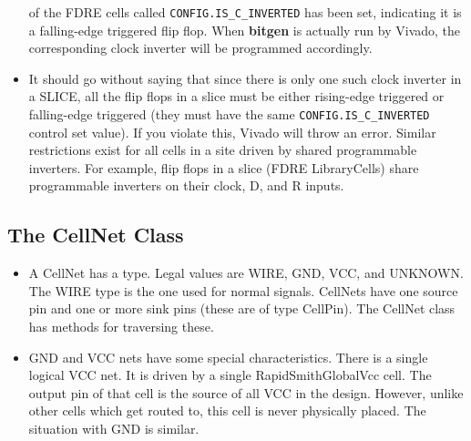\documentclass[12pt]{article}
\newcommand{\env}[1]{{\texttt{#1}}}
\newcommand{\pgm}[1]{{\textbf{#1}}}
\begin{document}
\begin{itemize}
  of the FDRE cells called \env{CONFIG.IS\_C\_INVERTED} has been set, indicating
  it is a falling-edge triggered flip flop.  When \pgm{bitgen} is actually run
  by Vivado, the corresponding clock inverter will be programmed accordingly.
  \item It should go without saying that since there is only one such clock
  inverter in a SLICE, all the flip flops in a slice must be either rising-edge
  triggered or falling-edge triggered (they must have the same
  \env{CONFIG.IS\_C\_INVERTED} control set value).  If you violate this, Vivado
  will throw an error.  Similar restrictions exist for all cells in a site driven by
  shared programmable inverters.  For example, flip flops in a slice (FDRE
  LibraryCells) share programmable inverters on their clock, D, and R inputs.
\end{itemize}

\subsection{The CellNet Class}
\begin{itemize}
  \item	A CellNet has a type.  Legal values are WIRE, GND, VCC, and UNKNOWN. 
  The WIRE type is the one used for normal signals.  CellNets have one source
  pin and one or more sink pins (these are of type CellPin).  The CellNet class
  has methods for traversing these.
  \item	GND and VCC nets have some special characteristics. There is a single
  logical VCC net.  It is driven by a single RapidSmithGlobalVcc cell.  The
  output pin of that cell is the source of all VCC in the design. However,
  unlike other cells which get routed to, this cell is never physically placed. 
  The situation with GND is similar.
\end{itemize}
\end{document}
